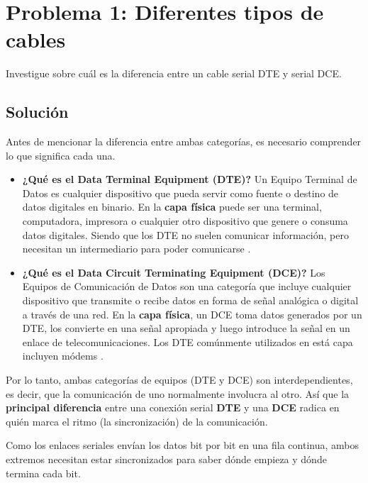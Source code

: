 \section{Problema 1: Diferentes tipos de cables}

\begin{tcolorbox}[enunciado]
Investigue sobre cuál es la diferencia entre un cable serial DTE y serial DCE.
\end{tcolorbox}

\subsection*{Solución}
Antes de mencionar la diferencia entre ambas categorías, es necesario comprender lo que significa cada una.

\begin{itemize}
    \item \textbf{¿Qué es el Data Terminal Equipment (DTE)?}
    Un Equipo Terminal de Datos es cualquier dispositivo que pueda servir como fuente o destino de datos digitales en binario. En la \textbf{capa física} puede ser una terminal, computadora, impresora o cualquier otro dispositivo que genere o consuma datos digitales. Siendo que los DTE no suelen comunicar información, pero necesitan un intermediario para poder comunicarse \cite{dte_vs_dce_cables} \cite{geeksforgeeks2020dte}.

    \item \textbf{¿Qué es el Data Circuit Terminating Equipment (DCE)?}
    Los Equipos de Comunicación de Datos son una categoría que incluye cualquier dispositivo que transmite o recibe datos en forma de señal analógica o digital a través de una red. En la \textbf{capa física}, un DCE toma datos generados por un DTE, los convierte en una señal apropiada y luego introduce la señal en un enlace de telecomunicaciones. Los DTE comúnmente utilizados en está capa incluyen módems \cite{geeksforgeeks2020dte}. 
\end{itemize}

Por lo tanto, ambas categorías de equipos (DTE y DCE) son interdependientes, es decir, que la comunicación de uno normalmente involucra al otro. Así que la \textbf{principal diferencia} entre una conexión serial \textbf{DTE} y una \textbf{DCE} radica en quién marca el ritmo (la sincronización) de la comunicación.

Como los enlaces seriales envían los datos bit por bit en una fila continua, ambos extremos necesitan estar sincronizados para saber dónde empieza y dónde termina cada bit.

